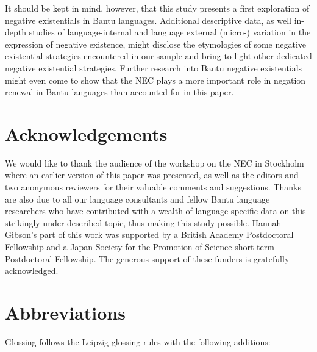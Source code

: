 \documentclass[output=paper]{langsci/langscibook}
\begin{document}
It should be kept in mind, however, that this study presents a first exploration of negative existentials in Bantu languages. Additional descriptive data, as well in-depth studies of language-internal and language external (micro-) variation in the expression of negative existence, might disclose the etymologies of some negative existential strategies encountered
in our sample and bring to light other dedicated negative existential strategies. Further research into Bantu negative existentials might even come to show that the NEC plays a more important role in negation renewal in Bantu languages than accounted for in this paper.

\section*{Acknowledgements}

We would like to thank the audience of the workshop on the NEC in Stockholm
where an earlier version of this paper was presented, as well as the
editors and two anonymous reviewers for their valuable comments and
suggestions. Thanks are also due to all our language consultants and fellow
Bantu language researchers who have contributed with a wealth of
language-specific data on this strikingly under-described topic, thus
making this study possible. Hannah Gibson's part of this work was supported
by a British Academy Postdoctoral Fellowship and a Japan Society for the
Promotion of Science short-term Postdoctoral Fellowship. The generous
support of these funders is gratefully acknowledged.

\section*{Abbreviations}
Glossing follows the Leipzig glossing rules with the following
additions:\\\nopagebreak
\end{document}
